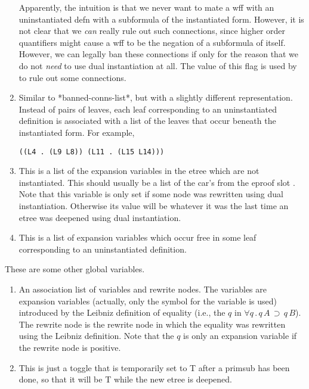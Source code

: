 \begin{enumerate}
Apparently, the intuition is that we never want to mate a wff with an uninstantiated defn with a subformula
of the instantiated form.  However, it is not clear that we {\it can} really rule out such connections,
since higher order quantifiers might cause a wff to be the negation of a subformula of itself.
However, we can legally ban these connections if only for the reason that we do not {\it need} to use
dual instantiation at all.
The value of this flag is used by  to rule out some connections.
\item {}  Similar to *banned-conns-list*, but with a slightly different
representation.  Instead of pairs of leaves, each leaf corresponding to an uninstantiated definition
is associated with a list of the leaves that occur beneath the instantiated form.  For example,
\begin{verbatim}
((L4 . (L9 L8)) (L11 . (L15 L14)))
\end{verbatim}
\item {}  This is a list of the expansion variables in the etree
which are not instantiated.  This should usually be a list of the car's from the 
eproof slot .  Note that this variable is only set if some node
was rewritten using dual instantiation.  Otherwise its value will be whatever it was the last time
an etree was deepened using dual instantiation.
\item {}  This is a list of expansion variables which occur free
in some leaf corresponding to an uninstantiated definition.
\end{enumerate}

These are some other global variables.
\begin{enumerate}
\item {}  An association list of variables and rewrite nodes.
The variables are expansion variables (actually, only
the symbol for the variable is used) introduced by the Leibniz definition of equality (i.e., the
$q$ in $\forall q \, . \, q \, A \, \supset \, q \, B$).  The rewrite node is the
rewrite node in which the equality was rewritten using the Leibniz definition.
Note that the $q$ is only an expansion variable if the rewrite node is positive.
\item {}  This is just a toggle that is temporarily set to T
after a primsub has been done, so that it will be T while the new etree is deepened.
\end{enumerate}

